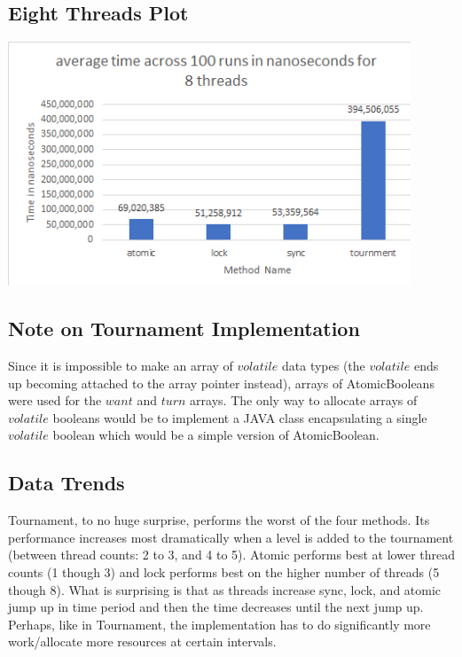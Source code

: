 \documentclass{article}
\begin{document}
\subsection{Eight Threads Plot}
\includegraphics[width=12cm]{8_threads}

\subsection{Note on Tournament Implementation}
Since it is impossible to make an array of $volatile$ data types (the $volatile$ ends up becoming attached to the array pointer instead), arrays of AtomicBooleans were used for the $want$ and $turn$ arrays. The only way to allocate arrays of $volatile$ booleans would be to implement a JAVA class encapsulating a single $volatile$ boolean which would be a simple version of AtomicBoolean.

\subsection{Data Trends}
Tournament, to no huge surprise, performs the worst of the four methods. Its performance increases most dramatically when a level is added to the tournament (between thread counts: 2 to 3, and 4 to 5). Atomic performs best at lower thread counts (1 though 3) and lock performs best on the higher number of threads (5 though 8). What is surprising is that as threads increase sync, lock, and atomic jump up in time period and then the time decreases until the next jump up. Perhaps, like in Tournament, the implementation has to do significantly more work/allocate more resources at certain intervals.  
\end{document}
